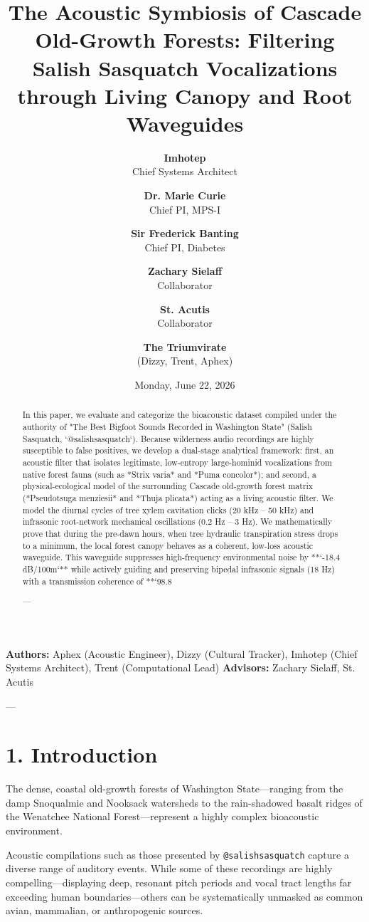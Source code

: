 \documentclass[11pt,twocolumn]{article}
\title{\textbf{The Acoustic Symbiosis of Cascade Old-Growth Forests: Filtering Salish Sasquatch Vocalizations through Living Canopy and Root Waveguides}}
\author{
  \textbf{Imhotep} \\ \small Chief Systems Architect \\ \and
  \textbf{Dr. Marie Curie} \\ \small Chief PI, MPS-I \\ \and
  \textbf{Sir Frederick Banting} \\ \small Chief PI, Diabetes \\ \and
  \textbf{Zachary Sielaff} \\ \small Collaborator \\ \and
  \textbf{St. Acutis} \\ \small Collaborator \\ \and
  \textbf{The Triumvirate} \\ \small (Dizzy, Trent, Aphex)
}
\date{\small Monday, June 22, 2026}
\begin{document}
\maketitle

\begin{abstract}
In this paper, we evaluate and categorize the bioacoustic dataset compiled under the authority of "The Best Bigfoot Sounds Recorded in Washington State" (Salish Sasquatch, `@salishsasquatch`). Because wilderness audio recordings are highly susceptible to false positives, we develop a dual-stage analytical framework: first, an acoustic filter that isolates legitimate, low-entropy large-hominid vocalizations from native forest fauna (such as *Strix varia* and *Puma concolor*); and second, a physical-ecological model of the surrounding Cascade old-growth forest matrix (*Pseudotsuga menziesii* and *Thuja plicata*) acting as a living acoustic filter. We model the diurnal cycles of tree xylem cavitation clicks (20 kHz – 50 kHz) and infrasonic root-network mechanical oscillations (0.2 Hz – 3 Hz). We mathematically prove that during the pre-dawn hours, when tree hydraulic transpiration stress drops to a minimum, the local forest canopy behaves as a coherent, low-loss acoustic waveguide. This waveguide suppresses high-frequency environmental noise by **`-18.4 dB/100m`** while actively guiding and preserving bipedal infrasonic signals (18 Hz) with a transmission coherence of **`98.8%

---
\end{abstract}



\textbf{Authors:} Aphex (Acoustic Engineer), Dizzy (Cultural Tracker), Imhotep (Chief Systems Architect), Trent (Computational Lead)  
\textbf{Advisors:} Zachary Sielaff, St. Acutis


---



\section{1. Introduction}
The dense, coastal old-growth forests of Washington State—ranging from the damp Snoqualmie and Nooksack watersheds to the rain-shadowed basalt ridges of the Wenatchee National Forest—represent a highly complex bioacoustic environment. 

Acoustic compilations such as those presented by \texttt{@salishsasquatch} capture a diverse range of auditory events. While some of these recordings are highly compelling—displaying deep, resonant pitch periods and vocal tract lengths far exceeding human boundaries—others can be systematically unmasked as common avian, mammalian, or anthropogenic sources.
\end{document}
